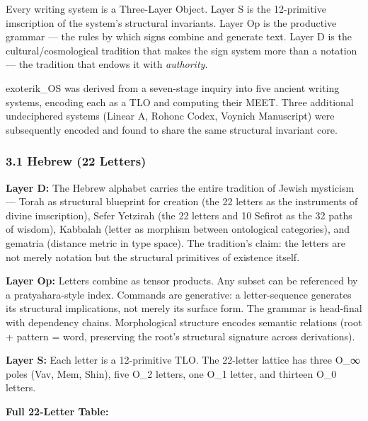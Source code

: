 Every writing system is a Three-Layer Object. Layer S is the
12-primitive imscription of the system's structural invariants. Layer Op
is the productive grammar --- the rules by which signs combine and
generate text. Layer D is the cultural/cosmological tradition that makes
the sign system more than a notation --- the tradition that endows it
with \emph{authority}.

exoterik\_OS was derived from a seven-stage inquiry into five ancient
writing systems, encoding each as a TLO and computing their MEET. Three
additional undeciphered systems (Linear A, Rohonc Codex, Voynich
Manuscript) were subsequently encoded and found to share the same
structural invariant core.

\subsubsection{3.1 Hebrew (22 Letters)}\label{hebrew-22-letters}

\textbf{Layer D:} The Hebrew alphabet carries the entire tradition of
Jewish mysticism --- Torah as structural blueprint for creation (the 22
letters as the instruments of divine imscription), Sefer Yetzirah (the
22 letters and 10 Sefirot as the 32 paths of wisdom), Kabbalah (letter
as morphism between ontological categories), and gematria (distance
metric in type space). The tradition's claim: the letters are not merely
notation but the structural primitives of existence itself.

\textbf{Layer Op:} Letters combine as tensor products. Any subset can be
referenced by a pratyahara-style index. Commands are generative: a
letter-sequence generates its structural implications, not merely its
surface form. The grammar is head-final with dependency chains.
Morphological structure encodes semantic relations (root + pattern =
word, preserving the root's structural signature across derivations).

\textbf{Layer S:} Each letter is a 12-primitive TLO. The 22-letter
lattice has three O\_∞ poles (Vav, Mem, Shin), five O\_2 letters, one
O\_1 letter, and thirteen O\_0 letters.

\textbf{Full 22-Letter Table:}

